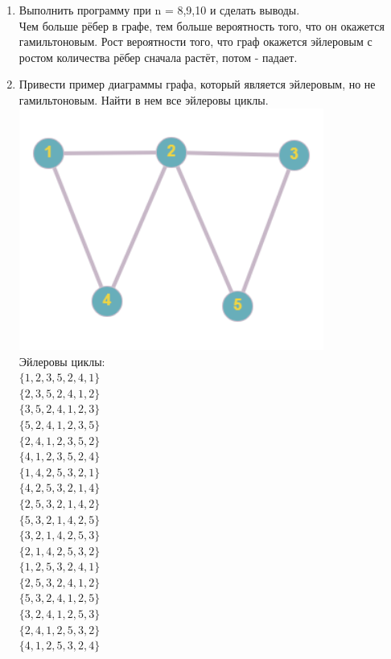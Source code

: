 \documentclass[a4paper,14pt]{extarticle}
\begin{document}
\begin{enumerate}[1.]
    \item Выполнить программу при n = 8,9,10 и сделать выводы.\\
          Чем больше рёбер в графе, тем больше вероятность того, что он окажется
          гамильтоновым.
          Рост вероятности того, что граф окажется эйлеровым с ростом количества рёбер сначала растёт, потом - падает.
    \item Привести пример диаграммы графа, который является эйлеровым,
          но не гамильтоновым. Найти в нем все эйлеровы циклы.\\
          \includegraphics[width=100mm]{4}\\
          Эйлеровы циклы:\\
          $\{1, 2, 3, 5, 2, 4, 1\}$\\
          $\{2, 3, 5, 2, 4, 1, 2\}$\\
          $\{3, 5, 2, 4, 1, 2, 3\}$\\
          $\{5, 2, 4, 1, 2, 3, 5\}$\\
          $\{2, 4, 1, 2, 3, 5, 2\}$\\
          $\{4, 1, 2, 3, 5, 2, 4\}$\\

          $\{1, 4, 2, 5, 3, 2, 1\}$\\
          $\{4, 2, 5, 3, 2, 1, 4\}$\\
          $\{2, 5, 3, 2, 1, 4, 2\}$\\
          $\{5, 3, 2, 1, 4, 2, 5\}$\\
          $\{3, 2, 1, 4, 2, 5, 3\}$\\
          $\{2, 1, 4, 2, 5, 3, 2\}$\\

          $\{1, 2, 5, 3, 2, 4, 1\}$\\
          $\{2, 5, 3, 2, 4, 1, 2\}$\\
          $\{5, 3, 2, 4, 1, 2, 5\}$\\
          $\{3, 2, 4, 1, 2, 5, 3\}$\\
          $\{2, 4, 1, 2, 5, 3, 2\}$\\
          $\{4, 1, 2, 5, 3, 2, 4\}$\\


\end{enumerate}
\end{document}
